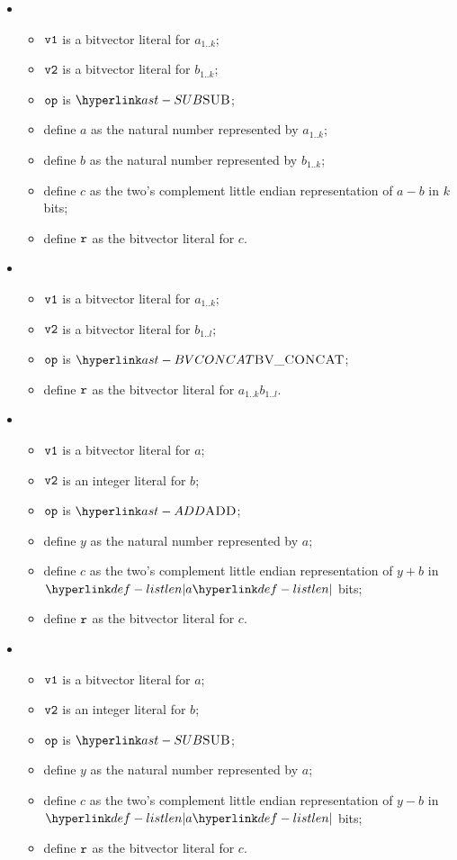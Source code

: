 \begin{itemize}
  \item {}
  \begin{itemize}
    \item $\texttt{v1}$ is a bitvector literal for $a_{1..k}$;
    \item $\texttt{v2}$ is a bitvector literal for $b_{1..k}$;
    \item $\texttt{op}$ is $\SUB$;
    \item define $a$ as the natural number represented by $a_{1..k}$;
    \item define $b$ as the natural number represented by $b_{1..k}$;
    \item define $c$ as the two's complement little endian representation of $a-b$ in $k$ bits;
    \item define $\texttt{r}$ as the bitvector literal for $c$.
  \end{itemize}

  \item {}
  \begin{itemize}
    \item $\texttt{v1}$ is a bitvector literal for $a_{1..k}$;
    \item $\texttt{v2}$ is a bitvector literal for $b_{1..l}$;
    \item $\texttt{op}$ is $\BVCONCAT$;
    \item define $\texttt{r}$ as the bitvector literal for $a_{1..k}b_{1..l}$.
  \end{itemize}

  \item {}
  \begin{itemize}
    \item $\texttt{v1}$ is a bitvector literal for $a$;
    \item $\texttt{v2}$ is an integer literal for $b$;
    \item $\texttt{op}$ is $\ADD$;
    \item define $y$ as the natural number represented by $a$;
    \item define $c$ as the two's complement little endian representation of $y+b$ in $\listlen{a}$ bits;
    \item define $\texttt{r}$ as the bitvector literal for $c$.
  \end{itemize}

  \item {}
  \begin{itemize}
    \item $\texttt{v1}$ is a bitvector literal for $a$;
    \item $\texttt{v2}$ is an integer literal for $b$;
    \item $\texttt{op}$ is $\SUB$;
    \item define $y$ as the natural number represented by $a$;
    \item define $c$ as the two's complement little endian representation of $y-b$ in $\listlen{a}$ bits;
    \item define $\texttt{r}$ as the bitvector literal for $c$.
  \end{itemize}


\end{itemize}
